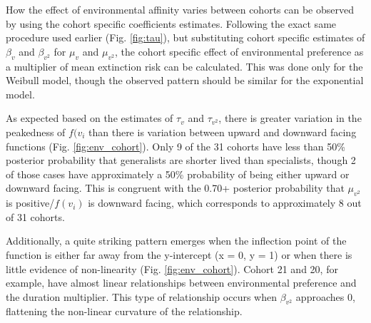 \documentclass[12pt,letterpaper]{article}
\begin{document}
How the effect of environmental affinity varies between cohorts can be observed by using the cohort specific coefficients estimates. Following the exact same procedure used earlier (Fig. \ref{fig:tau}), but substituting cohort specific estimates of \(\beta_{v}\) and \(\beta_{v^{2}}\) for \(\mu_{v}\) and \(\mu_{v^{2}}\), the cohort specific effect of environmental preference as a multiplier of mean extinction risk can be calculated. This was done only for the Weibull model, though the observed pattern should be similar for the exponential model. 

As expected based on the estimates of \(\tau_{v}\) and \(\tau_{v^{2}}\), there is greater variation in the peakedness of \(f(v_{i}\) than there is variation between upward and downward facing functions (Fig. \ref{fig:env_cohort}). Only 9 of the 31 cohorts have less than 50\% posterior probability that generalists are shorter lived than specialists, though 2 of those cases have approximately a 50\% probability of being either upward or downward facing. This is congruent with the 0.70+ posterior probability that \(\mu_{v^{2}}\) is positive/\(f(v_{i})\) is downward facing, which corresponds to approximately 8 out of 31 cohorts.

Additionally, a quite striking pattern emerges when the inflection point of the function is either far away from the y-intercept (x = 0, y = 1) or when there is little evidence of non-linearity (Fig. \ref{fig:env_cohort}). Cohort 21 and 20, for example, have almost linear relationships between environmental preference and the duration multiplier. This type of relationship occurs when \(\beta_{v^{2}}\) approaches 0, flattening the non-linear curvature of the relationship.
\end{document}
